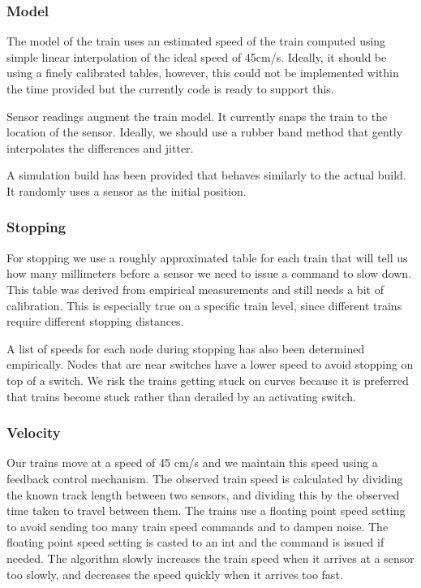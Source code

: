 \documentclass[letterpaper]{article}
\begin{document}
\subsubsection{Model%
  \label{model}%
}

The model of the train uses an estimated speed of the train computed using simple linear interpolation of the ideal speed of 45cm/s. Ideally, it should be using a finely calibrated tables, however, this could not be implemented within the time provided but the currently code is ready to support this.

Sensor readings augment the train model. It currently snaps the train to the location of the sensor. Ideally, we should use a rubber band method that gently interpolates the differences and jitter.

A simulation build has been provided that behaves similarly to the actual build. It randomly uses a sensor as the initial position.


\subsubsection{Stopping%
  \label{stopping}%
}

For stopping we use a roughly approximated table for each train that will tell us how many millimeters before a sensor we need to issue a command to slow down.  This table was derived from empirical measurements and still needs a bit of calibration.  This is especially true on a specific train level, since different trains require different stopping distances.

A list of speeds for each node during stopping has also been determined empirically. Nodes that are near switches have a lower speed to avoid stopping on top of a switch. We risk the trains getting stuck on curves because it is preferred that trains become stuck rather than derailed by an activating switch.


\subsubsection{Velocity%
  \label{velocity}%
}

Our trains move at a speed of 45 cm/s and we maintain this speed using a feedback control mechanism. The observed train speed is calculated by dividing the known track length between two sensors, and dividing this by the observed time taken to travel between them.  The trains use a floating point speed setting to avoid sending too many train speed commands and to dampen noise. The floating point speed setting is casted to an int and the command is issued if needed. The algorithm slowly increases the train speed when it arrives at a sensor too slowly, and decreases the speed quickly when it arrives too fast.
\end{document}
